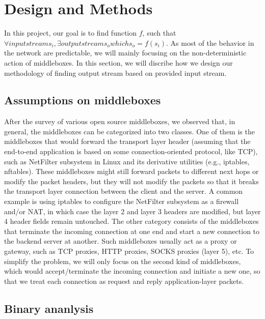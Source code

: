\section{Design and Methods}

In this project, our goal is to find function $f$, such that
\(\forall input stream s_i, \exists output stream s_o which s_o = f(s_i)\).
As most of the behavior in the network are predictable, we will mainly focusing
on the non-deterministic action of middleboxes.  In this section, we will
discribe how we design our methodology of finding output stream based on
provided input stream.

\subsection{Assumptions on middleboxes}

After the survey of various open source middleboxes, we observed that, in
general, the middleboxes can be categorized into two classes. One of them is the
middleboxes that would forward the transport layer header (assuming that the
end-to-end application is based on some connection-oriented protocol, like TCP),
such as NetFilter subsystem in Linux and its derivative utilities (e.g.,
iptables, nftables). These middleboxes might still forward packets to different
next hops or modify the packet headers, but they will not modify the packets so
that it breaks the transport layer connection between the client and the server.
A common example is using iptables to configure the NetFilter subsystem as a
firewall and/or NAT, in which case the layer 2 and layer 3 headers are modified,
but layer 4 header fields remain untouched. The other category consists of the
middleboxes that terminate the incoming connection at one end and start a new
connection to the backend server at another. Such middleboxes usually act as a
proxy or gateway, such as TCP proxies, HTTP proxies, SOCKS proxies (layer 5),
etc. To simplify the problem, we will only focus on the second kind of
middleboxes, which would accept/terminate the incoming connection and initiate a
new one, so that we treat each connection as request and reply application-layer
packets.

\subsection{Binary ananlysis}

